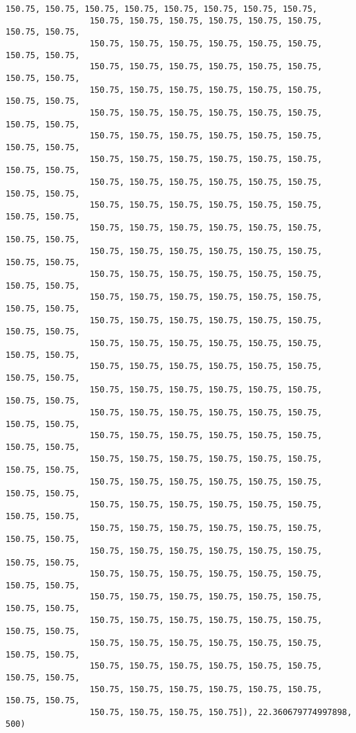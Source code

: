 \documentclass[11pt]{article}
\begin{document}
\begin{Verbatim}[commandchars=\\\{\}]
                 150.75, 150.75, 150.75, 150.75, 150.75, 150.75, 150.75, 150.75,
                 150.75, 150.75, 150.75, 150.75, 150.75, 150.75, 150.75, 150.75,
                 150.75, 150.75, 150.75, 150.75, 150.75, 150.75, 150.75, 150.75,
                 150.75, 150.75, 150.75, 150.75, 150.75, 150.75, 150.75, 150.75,
                 150.75, 150.75, 150.75, 150.75, 150.75, 150.75, 150.75, 150.75,
                 150.75, 150.75, 150.75, 150.75, 150.75, 150.75, 150.75, 150.75,
                 150.75, 150.75, 150.75, 150.75, 150.75, 150.75, 150.75, 150.75,
                 150.75, 150.75, 150.75, 150.75, 150.75, 150.75, 150.75, 150.75,
                 150.75, 150.75, 150.75, 150.75, 150.75, 150.75, 150.75, 150.75,
                 150.75, 150.75, 150.75, 150.75, 150.75, 150.75, 150.75, 150.75,
                 150.75, 150.75, 150.75, 150.75, 150.75, 150.75, 150.75, 150.75,
                 150.75, 150.75, 150.75, 150.75, 150.75, 150.75, 150.75, 150.75,
                 150.75, 150.75, 150.75, 150.75, 150.75, 150.75, 150.75, 150.75,
                 150.75, 150.75, 150.75, 150.75, 150.75, 150.75, 150.75, 150.75,
                 150.75, 150.75, 150.75, 150.75, 150.75, 150.75, 150.75, 150.75,
                 150.75, 150.75, 150.75, 150.75, 150.75, 150.75, 150.75, 150.75,
                 150.75, 150.75, 150.75, 150.75, 150.75, 150.75, 150.75, 150.75,
                 150.75, 150.75, 150.75, 150.75, 150.75, 150.75, 150.75, 150.75,
                 150.75, 150.75, 150.75, 150.75, 150.75, 150.75, 150.75, 150.75,
                 150.75, 150.75, 150.75, 150.75, 150.75, 150.75, 150.75, 150.75,
                 150.75, 150.75, 150.75, 150.75, 150.75, 150.75, 150.75, 150.75,
                 150.75, 150.75, 150.75, 150.75, 150.75, 150.75, 150.75, 150.75,
                 150.75, 150.75, 150.75, 150.75, 150.75, 150.75, 150.75, 150.75,
                 150.75, 150.75, 150.75, 150.75, 150.75, 150.75, 150.75, 150.75,
                 150.75, 150.75, 150.75, 150.75, 150.75, 150.75, 150.75, 150.75,
                 150.75, 150.75, 150.75, 150.75, 150.75, 150.75, 150.75, 150.75,
                 150.75, 150.75, 150.75, 150.75, 150.75, 150.75, 150.75, 150.75,
                 150.75, 150.75, 150.75, 150.75, 150.75, 150.75, 150.75, 150.75,
                 150.75, 150.75, 150.75, 150.75, 150.75, 150.75, 150.75, 150.75,
                 150.75, 150.75, 150.75, 150.75, 150.75, 150.75, 150.75, 150.75,
                 150.75, 150.75, 150.75, 150.75, 150.75, 150.75, 150.75, 150.75,
                 150.75, 150.75, 150.75, 150.75]), 22.360679774997898, 500)
\end{Verbatim}
            
\end{document}
